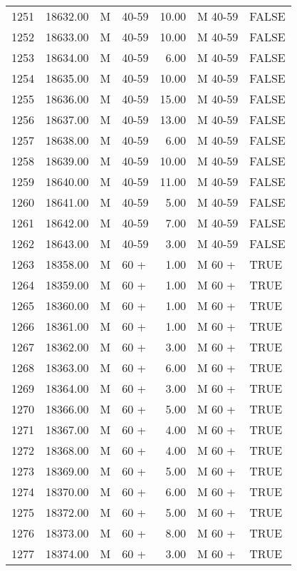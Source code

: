 \begin{table}[ht]
\begin{tabular}{rrllrll}
  1251 & 18632.00 & M & 40-59 & 10.00 & M 40-59 & FALSE \\ 
  1252 & 18633.00 & M & 40-59 & 10.00 & M 40-59 & FALSE \\ 
  1253 & 18634.00 & M & 40-59 & 6.00 & M 40-59 & FALSE \\ 
  1254 & 18635.00 & M & 40-59 & 10.00 & M 40-59 & FALSE \\ 
  1255 & 18636.00 & M & 40-59 & 15.00 & M 40-59 & FALSE \\ 
  1256 & 18637.00 & M & 40-59 & 13.00 & M 40-59 & FALSE \\ 
  1257 & 18638.00 & M & 40-59 & 6.00 & M 40-59 & FALSE \\ 
  1258 & 18639.00 & M & 40-59 & 10.00 & M 40-59 & FALSE \\ 
  1259 & 18640.00 & M & 40-59 & 11.00 & M 40-59 & FALSE \\ 
  1260 & 18641.00 & M & 40-59 & 5.00 & M 40-59 & FALSE \\ 
  1261 & 18642.00 & M & 40-59 & 7.00 & M 40-59 & FALSE \\ 
  1262 & 18643.00 & M & 40-59 & 3.00 & M 40-59 & FALSE \\ 
  1263 & 18358.00 & M & 60 + & 1.00 & M 60 + & TRUE \\ 
  1264 & 18359.00 & M & 60 + & 1.00 & M 60 + & TRUE \\ 
  1265 & 18360.00 & M & 60 + & 1.00 & M 60 + & TRUE \\ 
  1266 & 18361.00 & M & 60 + & 1.00 & M 60 + & TRUE \\ 
  1267 & 18362.00 & M & 60 + & 3.00 & M 60 + & TRUE \\ 
  1268 & 18363.00 & M & 60 + & 6.00 & M 60 + & TRUE \\ 
  1269 & 18364.00 & M & 60 + & 3.00 & M 60 + & TRUE \\ 
  1270 & 18366.00 & M & 60 + & 5.00 & M 60 + & TRUE \\ 
  1271 & 18367.00 & M & 60 + & 4.00 & M 60 + & TRUE \\ 
  1272 & 18368.00 & M & 60 + & 4.00 & M 60 + & TRUE \\ 
  1273 & 18369.00 & M & 60 + & 5.00 & M 60 + & TRUE \\ 
  1274 & 18370.00 & M & 60 + & 6.00 & M 60 + & TRUE \\ 
  1275 & 18372.00 & M & 60 + & 5.00 & M 60 + & TRUE \\ 
  1276 & 18373.00 & M & 60 + & 8.00 & M 60 + & TRUE \\ 
  1277 & 18374.00 & M & 60 + & 3.00 & M 60 + & TRUE \\ 

\end{tabular}
\end{table}
